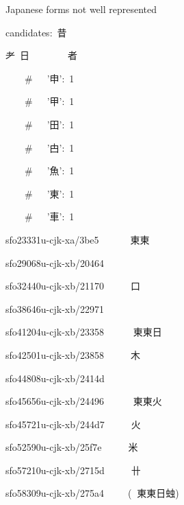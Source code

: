 



\vspace{\mktsLineheight}\begin{multicols}{3}\raggedcolumns{}

Japanese forms not well represented

\null\par{\mktsTightParagraphs{}

candidates: {\cjk{}昔}\par
{\cjk{}耂} {\cjk{}日}        {\cjk{}者}\par
    \#   '{\cjk{}申}': 1\par
    \#   '{\cjk{}甲}': 1\par
    \#   '{\cjk{}田}': 1\par
    \#   '{\cjk{}甴}': 1\par
    \#   '{\cjk{}魚}': 1\par
    \#   '{\cjk{}東}': 1\par
    \#   '{\cjk{}車}': 1\par
{}\par
sfo23331u-cjk-xa/3be5   {}   {\cnxJzr{}}{\cjk{}東東}\par
sfo29068u-cjk-xb/20464  {}   {\cnxJzr{}}{}\par
sfo32440u-cjk-xb/21170  {}   {\cnxJzr{}}{\cjk{}口{\cnxb{}𣍘}}\par
sfo38646u-cjk-xb/22971  {}   {\cnxJzr{}}{}\par
sfo41204u-cjk-xb/23358  {}   {\cnxJzr{}}{\cnxJzr{}}{\cjk{}東東日}\par
sfo42501u-cjk-xb/23858  {}   {\cnxJzr{}}{\cjk{}木{\cnxb{}𣍘}}\par
sfo44808u-cjk-xb/2414d  {}   {\cnxJzr{}}{}\par
sfo45656u-cjk-xb/24496  {}   {\cnxJzr{}}{\cnxJzr{}}{\cjk{}東東火}\par
sfo45721u-cjk-xb/244d7  {}   {\cnxJzr{}}{\cjk{}火{\cnxb{}𣍘}}\par
sfo52590u-cjk-xb/25f7e  {}   {\cnxJzr{}}{\cjk{}米{\cnxb{}𣍘}}\par
sfo57210u-cjk-xb/2715d  {}   {\cnxJzr{}}{\cjk{}卄{\cnxb{}𣍘}}\par
sfo58309u-cjk-xb/275a4  {}   ({\cnxJzr{}}{\cnxJzr{}}{\cjk{}東東日{\cnxa{}䖵}})\par
}
\end{multicols}
